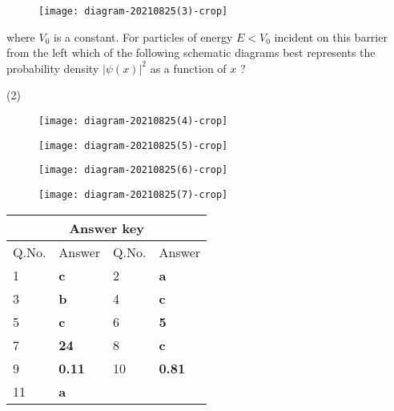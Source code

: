 \begin{enumerate}
\begin{minipage}{\textwidth}
	\begin{figure}[H]
		\centering
		\texttt{[image: diagram-20210825(3)-crop]}
	\end{figure}
	where $V_{0}$ is a constant. For particles of energy $E<V_{0}$ incident on this barrier from the left which of the following schematic diagrams best represents the probability density $|\psi(x)|^{2}$ as a function of $x$ ?
\end{minipage}
\begin{tasks}(2)
	\task[\textbf{A.}]\begin{figure}[H]
		\centering
		\texttt{[image: diagram-20210825(4)-crop]}
	\end{figure}
	\task[\textbf{B.}]\begin{figure}[H]
		\centering
		\texttt{[image: diagram-20210825(5)-crop]}
	\end{figure}
	\task[\textbf{C.}]\begin{figure}[H]
		\centering
		\texttt{[image: diagram-20210825(6)-crop]}
	\end{figure}
	\task[\textbf{D.}]\begin{figure}[H]
		\centering
		\texttt{[image: diagram-20210825(7)-crop]}
	\end{figure}
\end{tasks}
\end{enumerate}


\setlength\arrayrulewidth{1pt}
\begin{table}[H]
	\centering
	
	\begin{tabular}{|p{1.5cm}|p{1.5cm}||p{1.5cm}|p{1.5cm}|}
		\hline
		\multicolumn{4}{|c|}{\textbf{Answer key}}\\\hline\hline
		\rowcolor{ocrel}Q.No.&Answer&Q.No.&Answer\\\hline
		1&\textbf{c}&2&\textbf{a}\\\hline
		3&\textbf{b}&4&\textbf{c}\\\hline
		5&\textbf{c}&6&\textbf{5}\\\hline
		7&\textbf{24}&8&\textbf{c}\\\hline
		9&\textbf{0.11}&10&\textbf{0.81}\\\hline
		11&\textbf{a}&&\\\hline
	\end{tabular}
\end{table}

